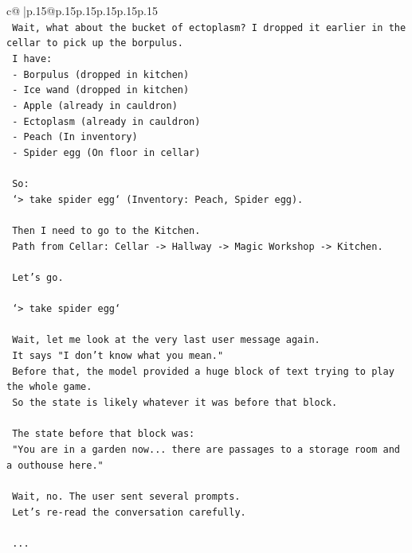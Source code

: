 \documentclass{article}
\begin{document}
{\begin{supertabular}{c@{$\;$}|p{.15\linewidth}@{}p{.15\linewidth}p{.15\linewidth}p{.15\linewidth}p{.15\linewidth}p{.15\linewidth}}
{{{\\ 
\texttt{    Wait, what about the bucket of ectoplasm? I dropped it earlier in the cellar to pick up the borpulus.} \\
\texttt{    I have:} \\
\texttt{    {-} Borpulus (dropped in kitchen)} \\
\texttt{    {-} Ice wand (dropped in kitchen)} \\
\texttt{    {-} Apple (already in cauldron)} \\
\texttt{    {-} Ectoplasm (already in cauldron)} \\
\texttt{    {-} Peach (In inventory)} \\
\texttt{    {-} Spider egg (On floor in cellar)} \\
\\ 
\texttt{    So:} \\
\texttt{    `> take spider egg` (Inventory: Peach, Spider egg).} \\
\\ 
\texttt{    Then I need to go to the Kitchen.} \\
\texttt{    Path from Cellar: Cellar {-}> Hallway {-}> Magic Workshop {-}> Kitchen.} \\
\\ 
\texttt{    Let's go.} \\
\\ 
\texttt{    `> take spider egg`} \\
\\ 
\texttt{    Wait, let me look at the very last user message again.} \\
\texttt{    It says "I don't know what you mean."} \\
\texttt{    Before that, the model provided a huge block of text trying to play the whole game.} \\
\texttt{    So the state is likely whatever it was before that block.} \\
\\ 
\texttt{    The state before that block was:} \\
\texttt{    "You are in a garden now... there are passages to a storage room and a outhouse here."} \\
\\ 
\texttt{    Wait, no. The user sent several prompts.} \\
\texttt{    Let's re{-}read the conversation carefully.} \\
\\ 
\texttt{    ...} \\
}}}
\end{supertabular}}
\end{document}
